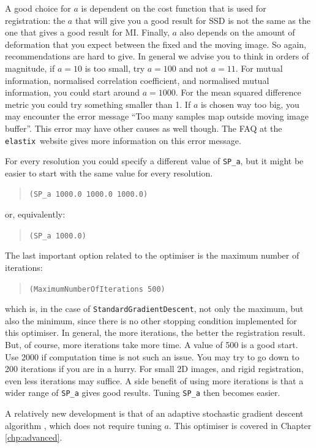 \documentclass[]{report}
\newcommand{\elastix}{\texttt{elastix}}
\begin{document}
A good choice for $a$ is dependent on the cost function that is used
for registration: the $a$ that will give you a good result for SSD
is not the same as the one that gives a good result for MI. Finally,
$a$ also depends on the amount of deformation that you expect
between the fixed and the moving image. So again, recommendations
are hard to give. In general we advise you to think in orders of
magnitude, if $a = 10$ is too small, try $a = 100$ and not $a = 11$.
For mutual information, normalised correlation coefficient, and
normalised mutual information, you could start around $a = 1000$.
For the mean squared difference metric you could try something
smaller than 1. If $a$ is chosen way too big, you may encounter the
error message ``Too many samples map outside moving image buffer''.
This error may have other causes as well though. The FAQ at the
\elastix\ website gives more information on this error message.

For every resolution you could specify a different value of
\texttt{SP\_a}, but it might be easier to start with the same
value for every resolution.
\begin{quote}
\texttt{(SP\_a 1000.0 1000.0 1000.0)}
\end{quote}
or, equivalently:
\begin{quote}
\texttt{(SP\_a 1000.0)}
\end{quote}

The last important option related to the optimiser is the maximum
number of iterations:
\begin{quote}
\texttt{(MaximumNumberOfIterations 500)}
\end{quote}
which is, in the case of \texttt{StandardGradientDescent}, not only
the maximum, but also the minimum, since there is no other stopping
condition implemented for this optimiser. In general, the more
iterations, the better the registration result. But, of course, more
iterations take more time. A value of 500 is a good start. Use 2000
if computation time is not such an issue. You may try to go down to
200 iterations if you are in a hurry. For small 2D images, and rigid
registration, even less iterations may suffice. A side benefit of
using more iterations is that a wider range of \texttt{SP\_a} gives
good results. Tuning \texttt{SP\_a} then becomes easier.

A relatively new development is that of an adaptive stochastic
gradient descent algorithm \cite{Klein09}, which does not require
tuning $a$. This optimiser is covered in Chapter \ref{chp:advanced}.
\end{document}
